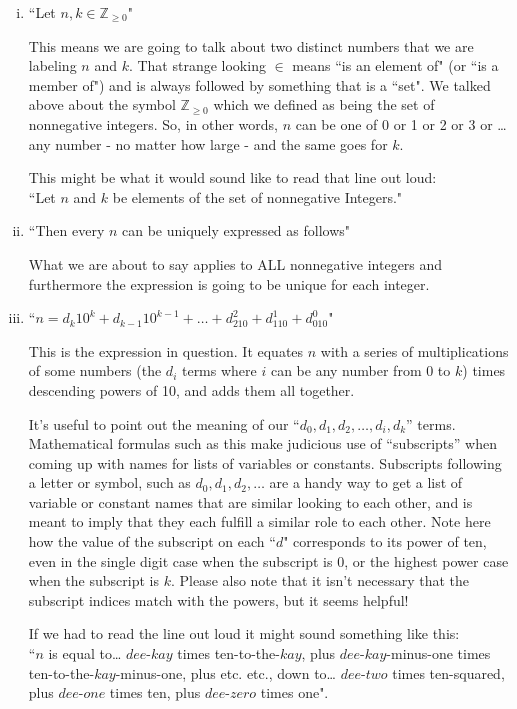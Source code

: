 \documentclass{article}
\begin{document}
\begin{enumerate}[i)]
\item ``Let $n,k\in \mathbb{Z}_{\ge 0}$"

This means we are going to talk about two distinct numbers
that we are labeling $n$ and $k$.
That strange looking $\in$ means ``is an element of" (or ``is a member of")
and is always followed by something that is a ``set".
We talked above about the symbol $\mathbb{Z}_{\ge 0}$ which
we defined as being the set of nonnegative integers.
So, in other words, $n$ can be one of 0 or 1 or 2 or 3 or \dots{} 
any number - no matter how large - and the same goes for $k$.

This might be what it would sound like to read that line out loud:\\
``Let $n$ and $k$ be elements of the set of nonnegative Integers."

\item ``Then every $n$ can be uniquely expressed as follows"

What we are about to say applies to ALL nonnegative integers
and furthermore the expression is going to be unique for each integer.

\item ``$n=d_k10^k+d_{k-1}10^{k-1}+\dots+d_210^2+d_110^1+d_010^0$"

This is the expression in question.  It equates $n$ with a series of multiplications
of some numbers (the $d_i$ terms where $i$ can be any
number from 0 to $k$) times descending powers of 10,
and adds them all together.

It's useful to point out the meaning of our ``$d_0,d_1,d_2,\dots{},d_i,d_k$'' terms.
Mathematical formulas such as this make judicious use of ``subscripts''
when coming up with names for lists of variables or constants.
Subscripts following a letter or symbol, such as $d_0,d_1,d_2,\dots{}$
are a handy way to get a list of variable or constant names that are similar looking to each other,
and is meant to imply that they each fulfill a similar role to each other.
Note here how the value of the subscript on each ``$d$" corresponds to its power of ten,
even in the single digit case when the subscript is 0,
or the highest power case when the subscript is $k$. Please also note that it
isn't necessary that the subscript indices match with the powers, but it seems helpful! 

If we had to read the line out loud it might sound something like this:\\
``$n$ is equal to\dots{} $dee$-$kay$ times ten-to-the-$kay$,
plus $dee$-$kay$-minus-one times ten-to-the-$kay$-minus-one,
plus etc. etc., down to\dots{} $dee$-$two$ times ten-squared,
plus $dee$-$one$ times ten, plus $dee$-$zero$ times one".


\end{enumerate}
\end{document}
